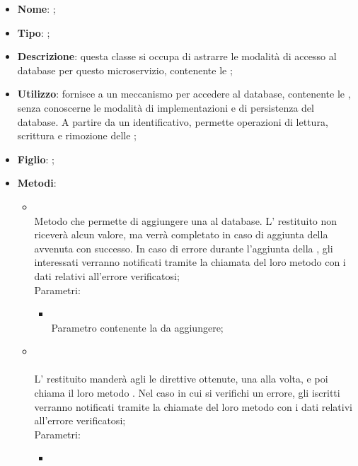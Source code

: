 \begin{itemize}
	\item \textbf{Nome}: ;
	\item \textbf{Tipo}: ;
	\item \textbf{Descrizione}: questa classe si occupa di astrarre le modalità di accesso al database per questo microservizio, contenente le ;
	\item \textbf{Utilizzo}: fornisce a  un meccanismo per accedere al database, contenente le , senza conoscerne le modalità di implementazioni e di persistenza del database. A partire da un identificativo, permette operazioni di lettura, scrittura e rimozione delle ;
	\item \textbf{Figlio}: ;
	\item \textbf{Metodi}:
	\begin{itemize}
		\item[]  \\		Metodo che permette di aggiungere una  al database. L' restituito non riceverà alcun valore, ma verrà completato in caso di aggiunta della  avvenuta con successo. In caso di errore durante l'aggiunta della , gli  interessati verranno notificati tramite la chiamata del loro metodo  con i dati relativi all'errore verificatosi;\\
		Parametri:
		\begin{itemize}
			\item {} \\
			Parametro contenente la  da aggiungere;
		\end{itemize}
		\item[]  \\\\		L' restituito manderà agli  le direttive ottenute, una alla volta, e poi chiama il loro metodo . Nel caso in cui si verifichi un errore, gli  iscritti verranno notificati tramite la chiamate del loro metodo  con i dati relativi all'errore verificatosi;\\
		Parametri:
		\begin{itemize}
			\item {} \\

\end{itemize}
\end{itemize}
\end{itemize}
